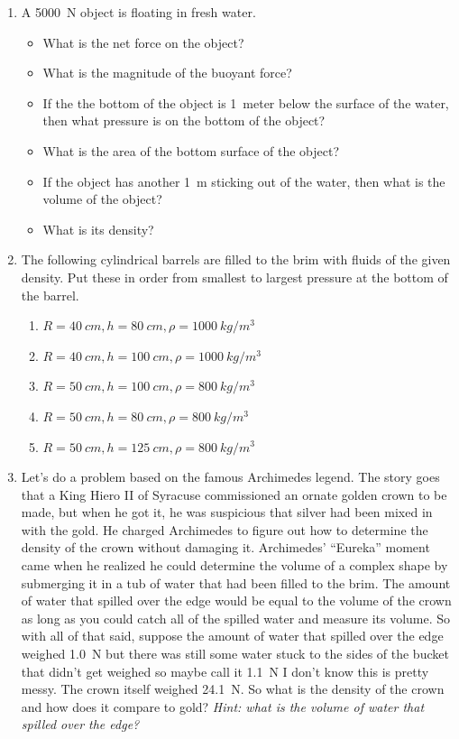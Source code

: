 \begin{enumerate}
	\item
	A \SI{5000}{\newton} object is floating in fresh water. 
	\begin{itemize}
		\setlength\itemsep{1 in}
		\item What is the net force on the object?
		\item What is the magnitude of the buoyant force?
		\item If the the bottom of the object is \SI{1}{meter} below the surface of the water, then what pressure is on the bottom of the object?
		\item What is the area of the bottom surface of the object?
		\item If the object has another \SI{1}{\meter} sticking out of the water, then what is the volume of the object?
		\item What is its density?	
	\end{itemize}
	
	\item
	The following cylindrical barrels are filled to the brim with fluids of the given density. Put these in order from smallest to largest pressure at the bottom of the barrel.
	\begin{enumerate}
		\item $R=\SI{40}{cm}, h=\SI{80}{cm}, \rho=\SI{1000}{kg/m^3}$
		\item $R=\SI{40}{cm}, h=\SI{100}{cm}, \rho=\SI{1000}{kg/m^3}$
		\item $R=\SI{50}{cm}, h=\SI{100}{cm}, \rho=\SI{800}{kg/m^3}$
		\item $R=\SI{50}{cm}, h=\SI{80}{cm}, \rho=\SI{800}{kg/m^3}$
		\item $R=\SI{50}{cm}, h=\SI{125}{cm}, \rho=\SI{800}{kg/m^3}$
	\end{enumerate}\bigskip
	
	
	\item 
	Let's do a problem based on the famous Archimedes legend. The story goes that a King Hiero II of Syracuse commissioned an ornate golden crown to be made, but when he got it, he was suspicious that silver had been mixed in with the gold. He charged Archimedes to figure out how to determine the density of the crown without damaging it. Archimedes' ``Eureka'' moment came when he realized he could determine the volume of a complex shape by submerging it in a tub of water that had been filled to the brim. The amount of water that spilled over the edge would be equal to the volume of the crown as long as you could catch all of the spilled water and measure its volume. So with all of that said, suppose the amount of water that spilled over the edge weighed \SI{1.0}{\newton} but there was still some water stuck to the sides of the bucket that didn't get weighed so maybe call it \SI{1.1}{\newton} I don't know this is pretty messy. The crown itself weighed \SI{24.1}{\newton}. So what is the density of the crown and how does it compare to gold? \emph{Hint: what is the volume of water that spilled over the edge?}
	

\end{enumerate}

